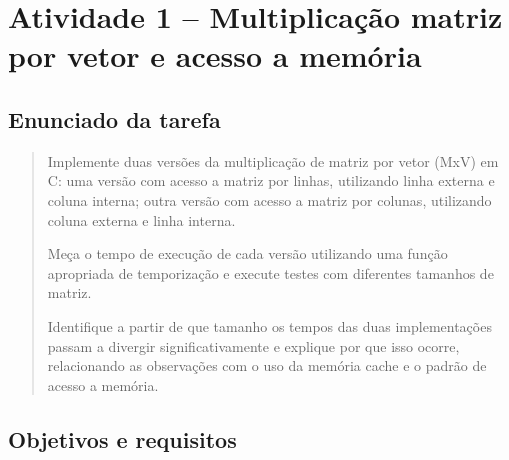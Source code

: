 %
%
%
%


\chapter{Atividade 1 -- Multiplicação matriz por vetor e acesso a memória}

\label{chap:atvd01}



\section{Enunciado da tarefa}

\label{sec:atvd01-enunciado}

\begin{quote}

Implemente duas versões da multiplicação de matriz por vetor (MxV) em C:
uma versão com acesso a matriz por linhas, utilizando linha externa e
coluna interna; outra versão com acesso a matriz por colunas, utilizando
coluna externa e linha interna.

Meça o tempo de execução de cada versão utilizando uma função apropriada
de temporização e execute testes com diferentes tamanhos de matriz.

Identifique a partir de que tamanho os tempos das duas implementações
passam a divergir significativamente e explique por que isso ocorre,
relacionando as observações com o uso da memória cache e o padrão de
acesso a memória.

\end{quote}



\section{Objetivos e requisitos}

